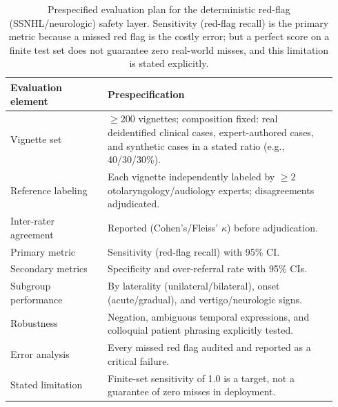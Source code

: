 \begin{table}[htbp]
\centering
\caption{Prespecified evaluation plan for the deterministic red-flag (SSNHL/neurologic) safety layer. Sensitivity (red-flag recall) is the primary metric because a missed red flag is the costly error; but a perfect score on a finite test set does not guarantee zero real-world misses, and this limitation is stated explicitly.}
\label{tab:redflag}
\small
\begin{tabular}{p{0.28\linewidth}p{0.66\linewidth}}
\toprule
Evaluation element & Prespecification \\
\midrule
Vignette set & $\geq$200 vignettes; composition fixed: real deidentified clinical cases, expert-authored cases, and synthetic cases in a stated ratio (e.g., 40/30/30\%). \\
Reference labeling & Each vignette independently labeled by $\geq$2 otolaryngology/audiology experts; disagreements adjudicated. \\
Inter-rater agreement & Reported (Cohen's/Fleiss' $\kappa$) before adjudication. \\
Primary metric & Sensitivity (red-flag recall) with 95\% CI. \\
Secondary metrics & Specificity and over-referral rate with 95\% CIs. \\
Subgroup performance & By laterality (unilateral/bilateral), onset (acute/gradual), and vertigo/neurologic signs. \\
Robustness & Negation, ambiguous temporal expressions, and colloquial patient phrasing explicitly tested. \\
Error analysis & Every missed red flag audited and reported as a critical failure. \\
Stated limitation & Finite-set sensitivity of 1.0 is a target, not a guarantee of zero misses in deployment. \\
\bottomrule
\end{tabular}
\end{table}

